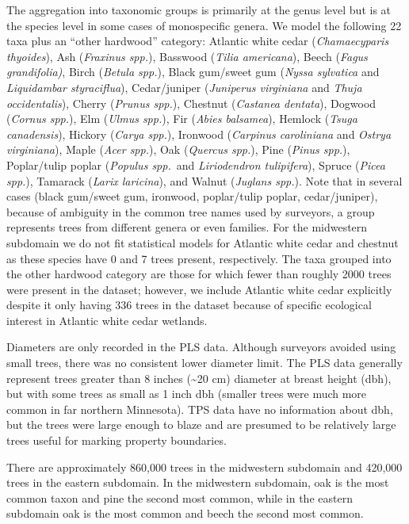 \documentclass[12pt]{article}\usepackage[]{graphicx}\usepackage[]{color}
\begin{document}
The aggregation into taxonomic groups is primarily at the genus level
but is at the species level in some cases of monospecific genera.
We model the following 22 taxa plus an ``other hardwood'' category:
Atlantic white cedar (\emph{Chamaecyparis thyoides}), Ash (\emph{Fraxinus
spp.}), Basswood (\emph{Tilia americana}), Beech (\emph{Fagus grandifolia)},
Birch (\emph{Betula spp.}), Black gum/sweet gum (\emph{Nyssa sylvatica}
and \emph{Liquidambar styraciflua}), Cedar/juniper (\emph{Juniperus
virginiana} and \emph{Thuja occidentalis}), Cherry (\emph{Prunus spp.}),
Chestnut (\emph{Castanea dentata}), Dogwood (\emph{Cornus spp.}),
Elm (\emph{Ulmus spp.}), Fir (\emph{Abies balsamea}), Hemlock (\emph{Tsuga
canadensis}), Hickory (\emph{Carya spp.}), Ironwood (\emph{Carpinus
caroliniana} and \emph{Ostrya virginiana}), Maple (\emph{Acer spp.}),
Oak (\emph{Quercus spp.}), Pine (\emph{Pinus spp.}), Poplar/tulip
poplar (\emph{Populus spp.}~and \emph{Liriodendron tulipifera}),
Spruce (\emph{Picea spp.}), Tamarack (\emph{Larix laricina}), and
Walnut (\emph{Juglans spp.}). Note that in several cases (black gum/sweet
gum, ironwood, poplar/tulip poplar, cedar/juniper), because of ambiguity
in the common tree names used by surveyors, a group represents trees
from different genera or even families. For the midwestern subdomain
we do not fit statistical models for Atlantic white cedar and chestnut
as these species have 0 and 7 trees present, respectively. The taxa
grouped into the other hardwood category are those for which fewer
than roughly 2000 trees were present in the dataset; however, we include
Atlantic white cedar explicitly despite it only having 336 trees in
the dataset because of specific ecological interest in Atlantic white
cedar wetlands. 

Diameters are only recorded in the PLS data. Although surveyors avoided
using small trees, there was no consistent lower diameter limit. The
PLS data generally represent trees greater than 8 inches (\textasciitilde{}20
cm) diameter at breast height (dbh), but with some trees as small
as 1 inch dbh (smaller trees were much more common in far northern
Minnesota). TPS data have no information about dbh, but the trees
were large enough to blaze and are presumed to be relatively large
trees useful for marking property boundaries.

There are approximately 860,000 trees in the midwestern subdomain
and 420,000 trees in the eastern subdomain. In the midwestern subdomain,
oak is the most common taxon and pine the second most common, while
in the eastern subdomain oak is the most common and beech the second
most common.
\end{document}
